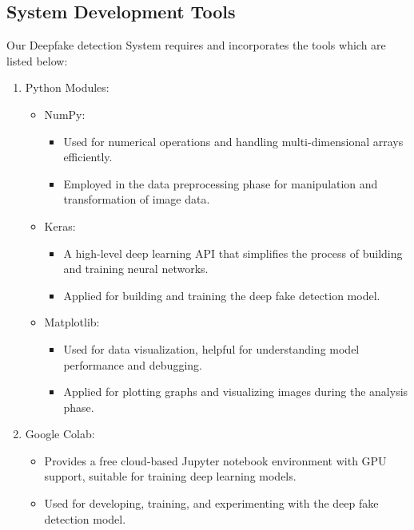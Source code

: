 \subsection{System Development Tools}
Our Deepfake detection System requires and incorporates the tools which are listed below:
\begin{enumerate}
    \item Python Modules:
          \begin{itemize}
              \item NumPy:
                    \begin{itemize}
                        \item Used for numerical operations and handling multi-dimensional arrays efficiently.
                        \item Employed in the data preprocessing phase for manipulation and transformation of image data.
                    \end{itemize}
              \item Keras:
                    \begin{itemize}
                        \item A high-level deep learning API that simplifies the process of building and training neural networks.
                        \item Applied for building and training the deep fake detection model.
                    \end{itemize}
              \item Matplotlib:
                    \begin{itemize}
                        \item Used for data visualization, helpful for understanding model performance and debugging.
                        \item Applied for plotting graphs and visualizing images during the analysis phase.
                    \end{itemize}
          \end{itemize}

    \item Google Colab:
          \begin{itemize}
              \item Provides a free cloud-based Jupyter notebook environment with GPU support, suitable for training deep learning models.
              \item Used for developing, training, and experimenting with the deep fake detection model.
          \end{itemize}


\end{enumerate}
